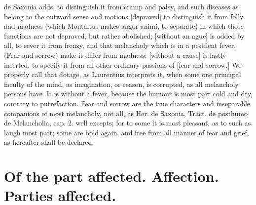 {{de Saxonia adds, to distinguish it from cramp and palsy, and such
diseases as belong to the outward sense and motions [depraved] to
distinguish it from folly and madness (which Montaltus makes angor
animi, to separate) in which those functions are not depraved, but
rather abolished; [without an ague] is added by all, to sever it from
frenzy, and that melancholy which is in a pestilent fever. (Fear and
sorrow) make it differ from madness: [without a cause] is lastly
inserted, to specify it from all other ordinary passions of [fear and
sorrow.] We properly call that dotage, as Laurentius interprets
it, when some one principal faculty of the mind, as imagination, or
reason, is corrupted, as all melancholy persons have. It is without a
fever, because the humour is most part cold and dry, contrary to
putrefaction. Fear and sorrow are the true characters and inseparable
companions of most melancholy, not all, as Her. de Saxonia, Tract. de
posthumo de Melancholia, cap. 2. well excepts; for to some it is most
pleasant, as to such as laugh most part; some are bold again, and free
from all manner of fear and grief, as hereafter shall be declared.

\section{Of the part affected. Affection. Parties affected.}\label{sec:parts-affected}

}}
